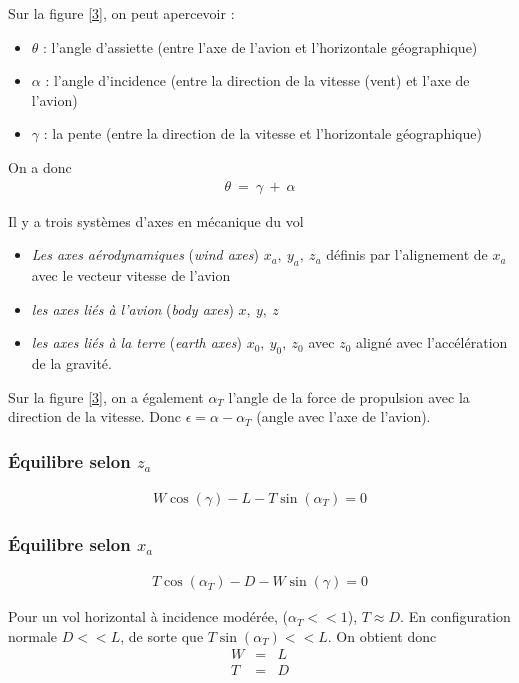 \documentclass{report}
\begin{document}
Sur la figure \ref{3}, on peut apercevoir :
\begin{itemize}
    \item $\theta$ : l'angle d'assiette (entre l'axe de l'avion et l'horizontale géographique)
    \item $\alpha$ : l'angle d'incidence (entre la direction de la vitesse (vent) et l'axe de l'avion)
    \item $\gamma$ : la pente (entre la direction de la vitesse et l'horizontale géographique)
\end{itemize}

On a donc 
\begin{eqnarray}
\theta ~=~ \gamma~+~\alpha
\end{eqnarray}

Il y a trois systèmes d'axes en mécanique du vol
\begin{itemize}
    \item \textit{Les axes aérodynamiques} (\textit{wind axes}) $x_a,~y_a,~z_a$ définis par l'alignement de $x_a$ avec le vecteur vitesse de l'avion
    \item \textit{les axes liés à l'avion} (\textit{body axes}) $x,~y,~z$
    \item \textit{les axes liés à la terre} (\textit{earth axes}) $x_0,~y_0,~z_0$ avec $z_0$ aligné avec l'accélération de la gravité.
\end{itemize}

Sur la figure \ref{3}, on a également $\alpha_T$ l'angle de la force de propulsion avec la direction de la vitesse. Donc $\epsilon = \alpha-\alpha_T$ (angle avec l'axe de l'avion).

\subsubsection{Équilibre selon $z_a$}

\begin{eqnarray}
W \cos(\gamma)-L-T\sin(\alpha_T)=0
\end{eqnarray}

\subsubsection{Équilibre selon $x_a$}
\begin{eqnarray}
T\cos(\alpha_T)-D-W \sin(\gamma)=0
\end{eqnarray}

Pour un vol horizontal à incidence modérée, ($\alpha_T<<1$), $T\approx D$. En configuration normale $D<<L$, de sorte que $T\sin(\alpha_T)<<L$. On obtient donc
\begin{eqnarray}
W&=&L\\
T&=&D
\end{eqnarray}
\end{document}
